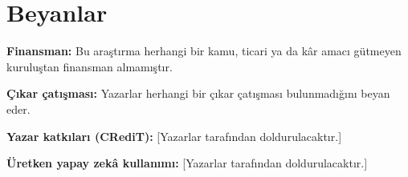 \documentclass[preprint,12pt]{elsarticle}
\begin{document}
\hypertarget{beyanlar}{%
\section*{Beyanlar}\label{beyanlar}}

\textbf{Finansman:} Bu araştırma herhangi bir kamu, ticari ya da k\^{a}r amacı gütmeyen kuruluştan finansman almamıştır.

\textbf{Çıkar çatışması:} Yazarlar herhangi bir çıkar çatışması bulunmadığını beyan eder.

\textbf{Yazar katkıları (CRediT):} {[}Yazarlar tarafından doldurulacaktır.{]}

\textbf{Üretken yapay zek\^{a} kullanımı:} {[}Yazarlar tarafından doldurulacaktır.{]}



\end{document}
